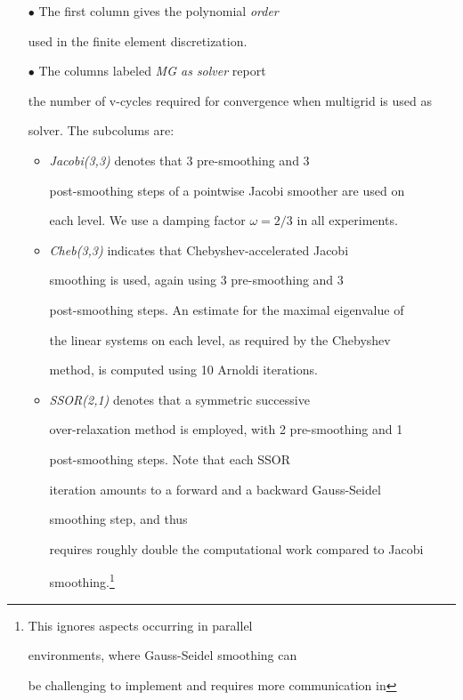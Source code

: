 \documentclass[smallcondensed,final]{svjour3}     %
\begin{document}
\begin{itemize}

\item[$\bullet$] The first column gives the polynomial \emph{order}

  used in the finite element discretization.

\item[$\bullet$] The columns labeled \emph{MG as solver} report

  the number of v-cycles required for convergence when multigrid is used as

  solver. The subcolums are:

  \begin{itemize}

  \item \emph{Jacobi(3,3)} denotes that 3 pre-smoothing and 3

    post-smoothing steps of a pointwise Jacobi smoother are used on

    each level. We use a damping factor $\omega=2/3$ in all experiments.

  \item \emph{Cheb(3,3)} indicates that Chebyshev-accelerated Jacobi

    smoothing is used, again using 3 pre-smoothing and 3

    post-smoothing steps. An estimate for the maximal eigenvalue of

    the linear systems on each level, as required by the Chebyshev

    method, is computed using 10 Arnoldi iterations.

  \item \emph{SSOR(2,1)} denotes that a symmetric successive

    over-relaxation method is employed, with 2 pre-smoothing and 1

    post-smoothing steps. Note that each SSOR

    iteration amounts to a forward and a backward Gauss-Seidel

    smoothing step, and thus

    requires  roughly double the computational work compared to Jacobi

    smoothing.\footnote{This ignores aspects occurring in parallel

      environments, where Gauss-Seidel smoothing can

      be challenging to implement and requires more communication in

}
\end{itemize}
\end{itemize}
\end{document}
